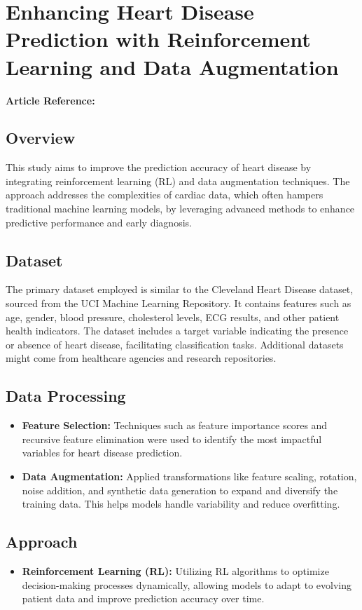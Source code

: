 \section{Enhancing Heart Disease Prediction with Reinforcement Learning and Data Augmentation}
\textbf{Article Reference:} \cite{article_5}

\subsection*{Overview}
This study aims to improve the prediction accuracy of heart disease by integrating reinforcement learning (RL) and data augmentation techniques. The approach addresses the complexities of cardiac data, which often hampers traditional machine learning models, by leveraging advanced methods to enhance predictive performance and early diagnosis.

\subsection*{Dataset}
The primary dataset employed is similar to the Cleveland Heart Disease dataset, sourced from the UCI Machine Learning Repository. It contains features such as age, gender, blood pressure, cholesterol levels, ECG results, and other patient health indicators. The dataset includes a target variable indicating the presence or absence of heart disease, facilitating classification tasks. Additional datasets might come from healthcare agencies and research repositories.

\subsection*{Data Processing}
\begin{itemize}
    \item \textbf{Feature Selection:} Techniques such as feature importance scores and recursive feature elimination were used to identify the most impactful variables for heart disease prediction.
    \item \textbf{Data Augmentation:} Applied transformations like feature scaling, rotation, noise addition, and synthetic data generation to expand and diversify the training data. This helps models handle variability and reduce overfitting.
\end{itemize}

\subsection*{Approach}
\begin{itemize}
    \item \textbf{Reinforcement Learning (RL):} Utilizing RL algorithms to optimize decision-making processes dynamically, allowing models to adapt to evolving patient data and improve prediction accuracy over time.
\end{itemize}

